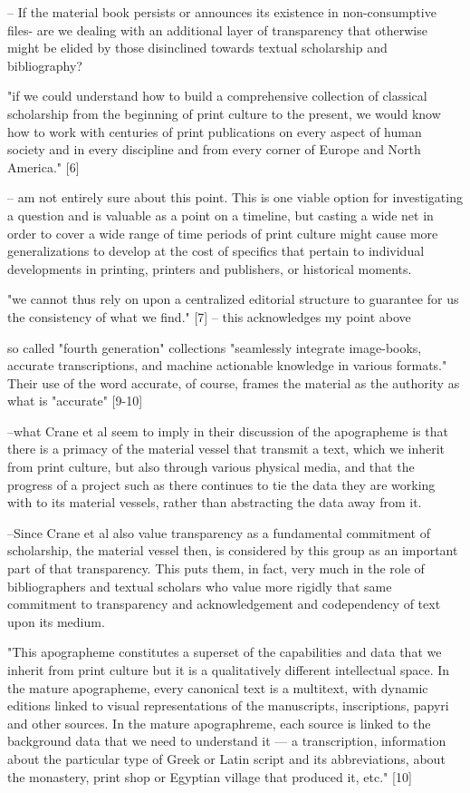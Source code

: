 \documentclass[course, english]{Notes}
\begin{document}
	-- {If the material book persists or announces its existence in non-consumptive files- are we dealing with an additional layer of transparency that otherwise might be elided by those disinclined towards textual scholarship and bibliography?}
	
 "if we could understand how to build a comprehensive collection of classical scholarship from the beginning of print culture to the present, we would know how to work with centuries of print publications on every aspect of human society and in every discipline and from every corner of Europe and North America." [6]
	
	--  {am not entirely sure about this point. This is one viable option for investigating a question and is valuable as a point on a timeline, but casting a wide net in order to cover a wide range of time periods of print culture might cause more generalizations to develop at the cost of specifics that pertain to individual developments in printing, printers and publishers, or historical moments.}

"we cannot thus rely on upon a centralized editorial structure to guarantee for us the consistency of what we find." [7]
			-- {this acknowledges my point above}
			
{so called "fourth generation" collections "seamlessly integrate image-books, accurate transcriptions, and machine actionable knowledge in various formats." Their use of the word accurate, of course, frames the material as the authority as what is "accurate"} [9-10]

 --{what Crane et al seem to imply in their discussion of the apographeme is that there is a primacy of the material vessel that transmit a text, which we inherit from print culture, but also through various physical media, and that the progress of a project such as there continues to tie the data they are working with to its material vessels, rather than abstracting the data away from it.}

 --{Since Crane et al also value transparency as a fundamental commitment of scholarship, the material vessel then, is considered by this group as an important part of that transparency. This puts them, in fact, very much in the role of bibliographers and textual scholars who value more rigidly that same commitment to transparency and acknowledgement and codependency of text upon its medium.}

"This apographeme constitutes a superset of the capabilities and data that we inherit from print culture but it is a qualitatively different intellectual space. In the mature apographeme, every canonical text is a multitext, with dynamic editions linked to visual representations of the manuscripts, inscriptions, papyri and other sources. In the mature apographreme, each source is linked to the background data that we need to understand it — a transcription, information about the particular type of Greek or Latin script and its abbreviations, about the monastery, print shop or Egyptian village that produced it, etc." [10]
\end{document}

